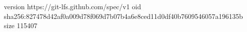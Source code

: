 version https://git-lfs.github.com/spec/v1
oid sha256:827478d42af0a009d78f069d7b07b4a6e8ced11d0df40b7609546057a196135b
size 115407
